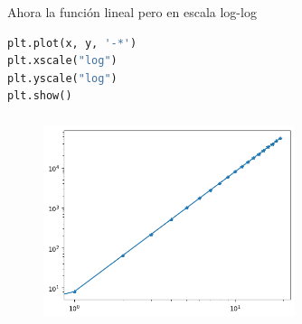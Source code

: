 Ahora la funci\'on lineal pero en escala log-log
\begin{lstlisting}[language=Python] 
plt.plot(x, y, '-*')
plt.xscale("log")
plt.yscale("log")
plt.show()
\end{lstlisting}
\begin{figure}[h]
\begin{center}
\includegraphics[height=2.4in,width=2.9in]{figuras/fig17}  
\label{figexp1lin}
\end{center}
\end{figure}



